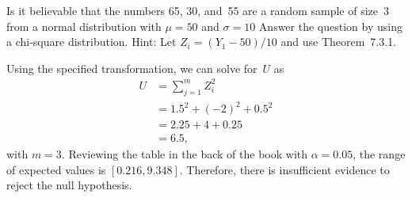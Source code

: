 \begin{problem}
  Is it believable that the numbers 65, 30, and~55 are a random sample of size~3 from a normal distribution with ${\mu = 50}$ and ${\sigma = 10}$ Answer the question by using a chi-square distribution. \textnormal{Hint: Let ${Z_i = (Y_1 - 50)/10}$ and use Theorem~7.3.1}.
\end{problem}

Using the specified transformation, we can solve for~$U$ as
\begin{align}
  U &= \sum_{j=1}^{m} Z_i^2 \\
    &= 1.5^2 + (-2)^2 + 0.5^2 \\
    &= 2.25 + 4 + 0.25 \\
    &= 6.5 \text{,}
\end{align}
\noindent
with ${m=3}$.  Reviewing the table in the back of the book with ${\alpha = 0.05}$, the range of expected values is ${[0.216, 9.348]}$.  Therefore, there is insufficient evidence to reject the null hypothesis.
